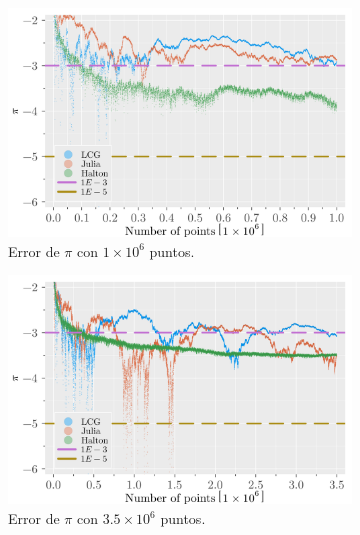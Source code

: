 \begin{enumerate}
\begin{solution}
        \clearpage
        \begin{figure}
            \centering
            \begin{subfigure}{0.45\textwidth}
                \centering
                \includegraphics[scale=0.065]{../figures/error_1E6.png}
                \caption{Error de $\pi$ con $1 \times 10^6$ puntos.}
            \end{subfigure}
            \hfill
            \begin{subfigure}{0.45\textwidth}
                \centering
                \includegraphics[scale=0.065]{../figures/error_3dot5E6.png}
                \caption{Error de $\pi$ con $3.5 \times 10^6$ puntos.}
            \end{subfigure}
            \begin{subfigure}{0.45\textwidth}
                \centering

\end{subfigure}
\end{figure}
\end{solution}
\end{enumerate}
